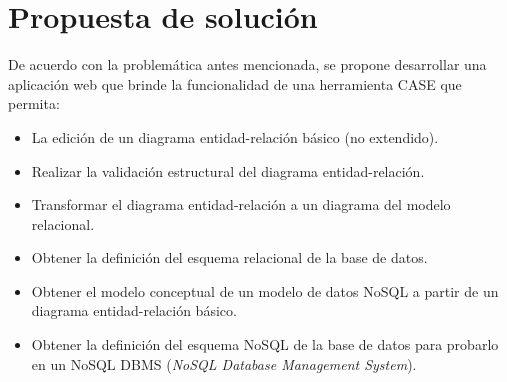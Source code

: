 \section{Propuesta de solución}

De acuerdo con la problemática antes mencionada, se propone desarrollar una aplicación web que brinde la funcionalidad de una herramienta CASE que permita:

\begin{itemize}
    \item La edición de un diagrama entidad-relación básico (no extendido).
    \item Realizar la validación estructural del diagrama entidad-relación.
    \item Transformar el diagrama entidad-relación a un diagrama del modelo relacional.
    \item Obtener la definición del esquema relacional de la base de datos.
    \item Obtener el modelo conceptual de un modelo de datos NoSQL a partir de un diagrama entidad-relación básico.
    \item Obtener la definición del esquema NoSQL de la base de datos para probarlo en un NoSQL DBMS (\textit{NoSQL Database Management System}).
\end{itemize}